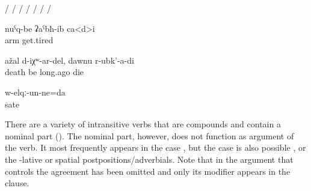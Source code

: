 \begin{exe}
	\ex	\label{ex:intransitiveverbs}
	\begin{xlist}
		\ex	{}\slash{} 
		\ex	{}\slash{} 
		\ex	{}\slash{} 
		\ex	{}\slash{} 
		\ex	{}\slash{} 
		\ex	{}\slash{} 
		\ex	{}\slash{}  
		\ex	{} 
		\ex	{} 
		\ex	{} 	
	\end{xlist}

	\ex	\label{ex:My arms got tiredValency}
	\gll	nuˁq-be	ʡaˁbħ-ib ca<d>i\\
		arm	get.tired \\
	\glt	{}

	\ex	\label{ex:If it was (the time) to die, I would have died long ago}
	\gll	ažal	d-iχʷ-ar-del,	dawnu	r-ubk'-a-di\\
		death	be	long.ago	die\\
	\glt	{}

	\ex	\label{ex:I got fed up}
	\gll	w-elqː-un-ne=da\\
		sate\\
	\glt	{}

\end{exe}

There are a variety of intransitive verbs that are compounds and contain a nominal part (). The nominal part, however, does not function as argument of the verb. It most frequently appears in the  case , but the  case is also possible , or the -lative or spatial postpositions/adverbials. Note that in  the  argument that controls the agreement has been omitted and only its  modifier appears in the clause.

